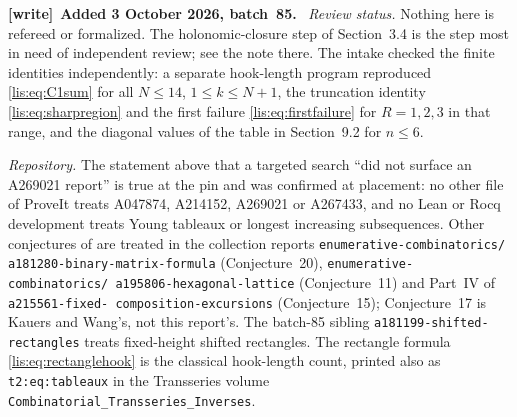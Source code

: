 \documentclass[11pt,letterpaper]{article}
\numberwithin{equation}{section}
\theoremstyle{definition}
\newenvironment{writenote}[1][]{\par\smallskip\begingroup\small
 \noindent\textbf{[write]}\if\relax\detokenize{#1}\relax\else~\textbf{#1.}\fi\ }%
 {\par\endgroup\smallskip}
\begin{document}
\begin{writenote}[Added 3 October 2026, batch~85]
\emph{Review status.} Nothing here is refereed or formalized. The
holonomic-closure step of Section~3.4 is the step most in need of
independent review; see the note there. The intake checked the finite
identities independently: a separate hook-length program reproduced
\eqref{lis:eq:C1sum} for all $N\le14$, $1\le k\le N+1$, the truncation
identity \eqref{lis:eq:sharpregion} and the first failure
\eqref{lis:eq:firstfailure} for $R=1,2,3$ in that range, and the
diagonal values of the table in Section~9.2 for $n\le6$.

\emph{Repository.} The statement above that a targeted search ``did not
surface an A269021 report'' is true at the pin and was confirmed at
placement: no other file of ProveIt treats A047874, A214152, A269021 or
A267433, and no Lean or Rocq development treats Young tableaux or
longest increasing subsequences. Other conjectures of \cite{KK} are
treated in the collection reports
\texttt{enumerative-\allowbreak combinatorics/\allowbreak
a181280-\allowbreak binary-\allowbreak matrix-\allowbreak formula}
(Conjecture~20), \texttt{enumerative-\allowbreak combinatorics/\allowbreak
a195806-\allowbreak hexagonal-\allowbreak lattice} (Conjecture~11) and
Part~IV of \texttt{a215561-\allowbreak fixed-\allowbreak
composition-\allowbreak excursions} (Conjecture~15); Conjecture~17 is
Kauers and Wang's, not this report's. The batch-85 sibling
\texttt{a181199-\allowbreak shifted-\allowbreak rectangles} treats
fixed-height shifted rectangles. The rectangle formula
\eqref{lis:eq:rectanglehook} is the classical hook-length count, printed
also as \texttt{t2:eq:tableaux} in the Transseries volume
\texttt{Combinatorial\_\allowbreak Transseries\_\allowbreak Inverses}.


\end{writenote}
\end{document}
